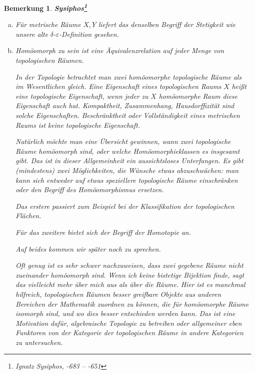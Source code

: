 \documentclass[12pt]{scrbook}   %
\newtheorem{bemX}[alles]{Bemerkung}
\newenvironment{bem}[1]{\begin{bemX}{\bf #1}\par\rm}{\end{bemX}}
\begin{document}
\begin{bem}{Sysiphos\footnote{Ignatz Sysiphos, -683 -- -651}}

\begin{enumerate}[a)]
\item Für metrische Räume $X,Y$ liefert das denselben Begriff der Stetigkeit wie unsere alte 
$\delta$-$\varepsilon$-Definition gesehen.

\item Homöomorph zu sein ist eine Äquivalenzrelation auf jeder Menge von topologischen Räumen.

In der Topologie betrachtet man zwei homöomorphe topologische Räume 
als
im Wesentlichen gleich. Eine Eigenschaft eines topologischen Raums $X$ 
heißt eine {\it topologische Eigenschaft}, wenn jeder zu $X$ homöomorphe
Raum diese Eigenschaft auch hat. Kompaktheit, Zusammenhang, Hausdorffizität
sind solche Eigenschaften. Beschränktheit oder Vollständigkeit eines 
metrischen Raums ist keine topologische Eigenschaft.

Natürlich möchte man eine Übersicht gewinnen,
wann zwei topologische Räume homöomorph sind, oder welche 
Homöomorphieklassen es insgesamt gibt. Das ist in dieser Allgemeinheit ein
aussichtsloses Unterfangen. Es gibt (mindestens) zwei Möglichkeiten, die
Wünsche etwas abzuschwächen: man kann sich entweder auf etwas speziellere
topologische Räume einschränken oder den Begriff des Homöomorphismus
ersetzen.

Das erstere passiert zum Beispiel bei der Klassifikation der topologischen
Flächen.

Für das zweitere bietet sich der Begriff der Homotopie an.

Auf beides kommen wir später noch zu sprechen.

Oft genug ist es sehr schwer nachzuweisen, dass zwei gegebene Räume nicht 
zueinander homöomorph sind. Wenn ich keine bistetige Bijektion finde, sagt 
das vielleicht mehr über mich aus als über die Räume. Hier ist es 
manchmal hilfreich, topologischen Räumen besser greifbare Objekte aus anderen
Bereichen der Mathematik zuordnen zu können, die für homöomorphe Räume 
isomorph sind, und wo dies besser entschieden werden kann. Das ist eine 
Motivation dafür, algebraische Topologie zu betreiben oder allgemeiner
eben Funktoren von der Kategorie der topologischen Räume in andere
Kategorien zu untersuchen. 

\end{enumerate}
\end{bem}
\end{document}
